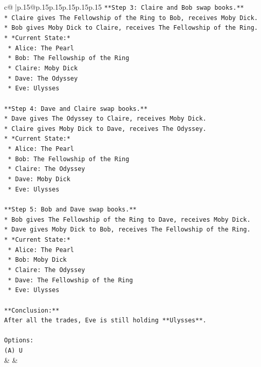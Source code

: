 \documentclass{article}
\begin{document}
{\begin{supertabular}{c@{$\;$}|p{.15\linewidth}@{}p{.15\linewidth}p{.15\linewidth}p{.15\linewidth}p{.15\linewidth}p{.15\linewidth}}
{{{\texttt{**Step 3: Claire and Bob swap books.**} \\
\texttt{*   Claire gives The Fellowship of the Ring to Bob, receives Moby Dick.} \\
\texttt{*   Bob gives Moby Dick to Claire, receives The Fellowship of the Ring.} \\
\texttt{*   *Current State:*} \\
\texttt{    *   Alice: The Pearl} \\
\texttt{    *   Bob: The Fellowship of the Ring} \\
\texttt{    *   Claire: Moby Dick} \\
\texttt{    *   Dave: The Odyssey} \\
\texttt{    *   Eve: Ulysses} \\
\\ 
\texttt{**Step 4: Dave and Claire swap books.**} \\
\texttt{*   Dave gives The Odyssey to Claire, receives Moby Dick.} \\
\texttt{*   Claire gives Moby Dick to Dave, receives The Odyssey.} \\
\texttt{*   *Current State:*} \\
\texttt{    *   Alice: The Pearl} \\
\texttt{    *   Bob: The Fellowship of the Ring} \\
\texttt{    *   Claire: The Odyssey} \\
\texttt{    *   Dave: Moby Dick} \\
\texttt{    *   Eve: Ulysses} \\
\\ 
\texttt{**Step 5: Bob and Dave swap books.**} \\
\texttt{*   Bob gives The Fellowship of the Ring to Dave, receives Moby Dick.} \\
\texttt{*   Dave gives Moby Dick to Bob, receives The Fellowship of the Ring.} \\
\texttt{*   *Current State:*} \\
\texttt{    *   Alice: The Pearl} \\
\texttt{    *   Bob: Moby Dick} \\
\texttt{    *   Claire: The Odyssey} \\
\texttt{    *   Dave: The Fellowship of the Ring} \\
\texttt{    *   Eve: Ulysses} \\
\\ 
\texttt{**Conclusion:**} \\
\texttt{After all the trades, Eve is still holding **Ulysses**.} \\
\\ 
\texttt{Options:} \\
\texttt{(A) U} \\
            }
        }
    }
    & & \\ \\


\end{supertabular}}
\end{document}
